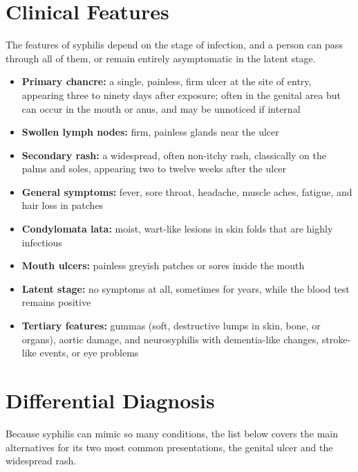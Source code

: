 \section*{Clinical Features}
The features of syphilis depend on the stage of infection, and a person can pass through all of them, or remain entirely asymptomatic in the latent stage.

\begin{itemize}
    \item \textbf{Primary chancre:} a single, painless, firm ulcer at the site of entry, appearing three to ninety days after exposure; often in the genital area but can occur in the mouth or anus, and may be unnoticed if internal
    \item \textbf{Swollen lymph nodes:} firm, painless glands near the ulcer
    \item \textbf{Secondary rash:} a widespread, often non-itchy rash, classically on the palms and soles, appearing two to twelve weeks after the ulcer
    \item \textbf{General symptoms:} fever, sore throat, headache, muscle aches, fatigue, and hair loss in patches
    \item \textbf{Condylomata lata:} moist, wart-like lesions in skin folds that are highly infectious
    \item \textbf{Mouth ulcers:} painless greyish patches or sores inside the mouth
    \item \textbf{Latent stage:} no symptoms at all, sometimes for years, while the blood test remains positive
    \item \textbf{Tertiary features:} gummas (soft, destructive lumps in skin, bone, or organs), aortic damage, and neurosyphilis with dementia-like changes, stroke-like events, or eye problems
\end{itemize}

\section*{Differential Diagnosis}
Because syphilis can mimic so many conditions, the list below covers the main alternatives for its two most common presentations, the genital ulcer and the widespread rash.

